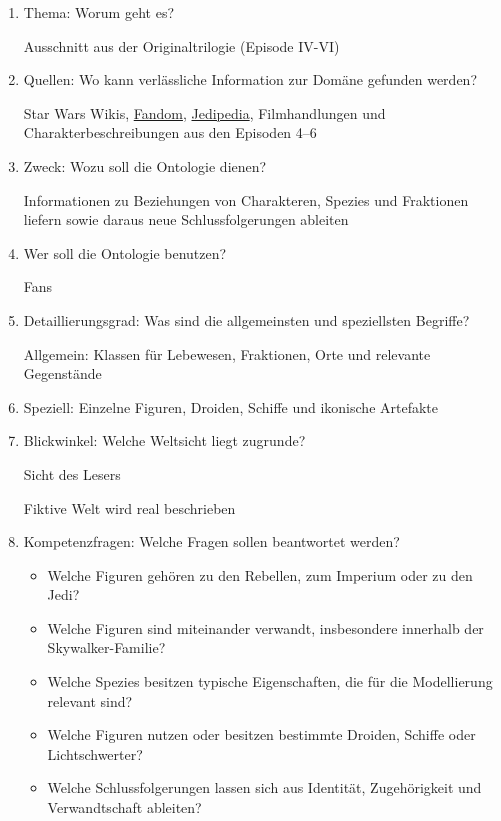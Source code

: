 \documentclass[a4paper]{article}
\begin{document}
    \begin{enumerate}
        \item Thema: Worum geht es?  
        
            Ausschnitt aus der Originaltrilogie (Episode IV-VI)  
        \item Quellen: Wo kann verlässliche Information zur Domäne gefunden werden? 
        
            Star Wars Wikis, \href{https://starwars.fandom.com/wiki/Star_Wars}{Fandom}, \href{https://www.jedipedia.net/wiki/Jedipedia:Hauptseite}{Jedipedia}, Filmhandlungen und Charakterbeschreibungen aus den Episoden 4--6
        \item Zweck: Wozu soll die Ontologie dienen? 
        
            Informationen zu Beziehungen von Charakteren, Spezies und Fraktionen liefern sowie daraus neue Schlussfolgerungen ableiten 
        \item Wer soll die Ontologie benutzen? 
        
        Fans
        \item Detaillierungsgrad: Was sind die allgemeinsten und speziellsten Begriffe? 
        
            Allgemein: Klassen für Lebewesen, Fraktionen, Orte und relevante Gegenstände 

            \item Speziell: Einzelne Figuren, Droiden, Schiffe und ikonische Artefakte 
        

        \item Blickwinkel: Welche Weltsicht liegt zugrunde? 
        
        Sicht des Lesers 

        Fiktive Welt wird real beschrieben 
        \item Kompetenzfragen: Welche Fragen sollen beantwortet werden? 
        
        \begin{itemize}
            \item Welche Figuren gehören zu den Rebellen, zum Imperium oder zu den Jedi?
            \item Welche Figuren sind miteinander verwandt, insbesondere innerhalb der Skywalker-Familie?
            \item Welche Spezies besitzen typische Eigenschaften, die für die Modellierung relevant sind?
            \item Welche Figuren nutzen oder besitzen bestimmte Droiden, Schiffe oder Lichtschwerter?
            \item Welche Schlussfolgerungen lassen sich aus Identität, Zugehörigkeit und Verwandtschaft ableiten?
        \end{itemize}


\end{enumerate}
\end{document}
